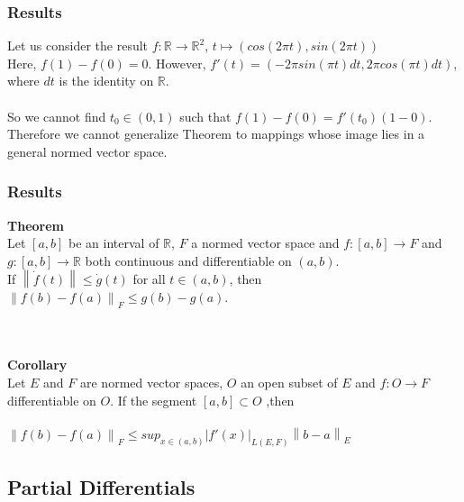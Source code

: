 \documentclass{beamer}
\newcommand{\R}{\mathbb{R}}
\newcommand\norm[1]{\left\lVert#1\right\rVert}
\begin{document}
\begin{frame}
\frametitle{Results}

Let us consider the result $f : \R \to \R^2$, $ t \mapsto (cos(2\pi t), sin(2\pi t))$ \\
Here, $f(1)-f(0) = 0$. However, $f'(t) = (-2\pi sin(\pi t) dt , 2\pi cos(\pi t) dt)$, where $dt$ is the identity on $\R$. \\~\\ So we cannot find $t_0 \in (0, 1)$ such that $f(1)-f(0) = f'(t_0)(1-0)$.\\ Therefore we cannot generalize Theorem to mappings whose image lies in a general normed vector space.
\end{frame}

\begin{frame}
\frametitle{Results}
\textbf{Theorem}\\
Let $[a,b]$ be an interval of $\R$, $F$ a normed vector space and $f:[a,b] \to F$ and $g: [a,b] \to \R$ both continuous and differentiable on $(a,b)$. \\If $\norm{\dot{f}(t)} \leq \dot{g}(t)$ for all $t \in (a,b)$, then \hspace*{3cm} $\norm{f(b) - f(a)}_F \leq g(b) - g(a)$.
		
\\~\\
\textbf{Corollary}\\
Let $E$ and $F$ are normed vector spaces, $O$ an open subset of $E$ and $f:O \to F$ differentiable on $O$. If the segment $[a,b] \subset O$ ,then\\~\\
\hspace*{2cm}   $ \norm{f(b)-f(a)}_F  \leq sup_{x \in (a,b)} |f'(x)|_{L(E, F)} \norm{b-a}_E $

\end{frame}

\subsection{Partial Differentials}
\end{document}
